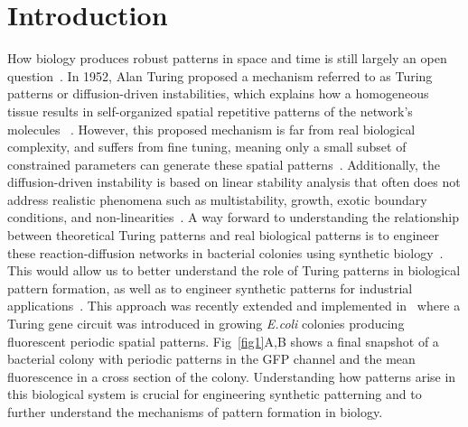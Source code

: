 \documentclass[10pt,letterpaper]{article}
\begin{document}
\linenumbers

\section*{Introduction}

How biology produces robust patterns in space and time is still largely an open question~\parencite{scholes2017three}.
In 1952, Alan Turing proposed a mechanism referred to as Turing patterns or diffusion-driven instabilities, which explains how a homogeneous tissue results in self-organized spatial repetitive patterns of the network’s molecules ~\parencite{Turing1952, Gierer1972}.
However, this proposed mechanism is far from real biological complexity, and suffers from fine tuning, meaning only a small subset of constrained parameters can generate these spatial patterns~\parencite{maini2012turing, Scholes2019}.
Additionally, the diffusion-driven instability is based on linear stability analysis that often does not address realistic phenomena such as multistability, growth, exotic boundary conditions, and non-linearities~\parencite{Krause2023}.
A way forward to understanding the relationship between theoretical Turing patterns and real biological patterns is to engineer these reaction-diffusion networks in bacterial colonies using synthetic biology~\parencite{Sekine2018, Karig2018}.
This would allow us to better understand the role of Turing patterns in biological pattern formation, as well as to engineer synthetic patterns for industrial applications~\parencite{cao2017programmable, tan2018polyamide,din2020interfacing}.
This approach was recently extended and implemented in~\cite{Oliver2023} where a Turing gene circuit was introduced in growing \textit{E.coli} colonies producing fluorescent periodic spatial patterns. Fig~\ref{fig1}A,B shows a final snapshot of a bacterial colony with periodic patterns in the GFP channel and the mean fluorescence in a cross section of the colony.
Understanding how patterns arise in this biological system is crucial for engineering synthetic patterning and to further understand the mechanisms of pattern formation in biology.
\end{document}
